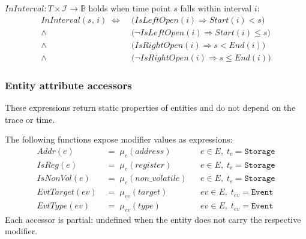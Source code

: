 \begin{definition}\label{def:in_interval}
    $\mathit{InInterval} : T \times \mathcal{I} \rightarrow \mathbb{B}$ holds when time point $s$ falls within interval $i$:
    \begin{align*}
        \mathit{InInterval}(s,\, i) \;\Leftrightarrow\;
         & \bigl(\mathit{IsLeftOpen}(i) \Rightarrow \mathit{Start}(i) < s\bigr)         \\
        \land\;
         & \bigl(\lnot\mathit{IsLeftOpen}(i) \Rightarrow \mathit{Start}(i) \leq s\bigr) \\
        \land\;
         & \bigl(\mathit{IsRightOpen}(i) \Rightarrow s < \mathit{End}(i)\bigr)          \\
        \land\;
         & \bigl(\lnot\mathit{IsRightOpen}(i) \Rightarrow s \leq \mathit{End}(i)\bigr)
    \end{align*}
\end{definition}

\subsubsection{Entity attribute accessors}\label{subsec:entity_attrs}

These expressions return static properties of entities and do not depend on the trace or time.

\begin{definition}\label{def:modifier_accessors}
    The following functions expose modifier values as expressions:
    \begin{align*}
        \mathit{Addr}(e)         &\;=\; \mu_e(\mathit{address})     & &e \in E,\; t_e = \texttt{Storage} \\
        \mathit{IsReg}(e)        &\;=\; \mu_e(\mathit{register})    & &e \in E,\; t_e = \texttt{Storage} \\
        \mathit{IsNonVol}(e)     &\;=\; \mu_e(\mathit{non\_volatile})& &e \in E,\; t_e = \texttt{Storage} \\
        \mathit{EvtTarget}(ev)   &\;=\; \mu_{ev}(\mathit{target})   & &ev \in E,\; t_{ev} = \texttt{Event} \\
        \mathit{EvtType}(ev)     &\;=\; \mu_{ev}(\mathit{type})     & &ev \in E,\; t_{ev} = \texttt{Event}
    \end{align*}
    Each accessor is partial: undefined when the entity does not carry the respective modifier.
\end{definition}

